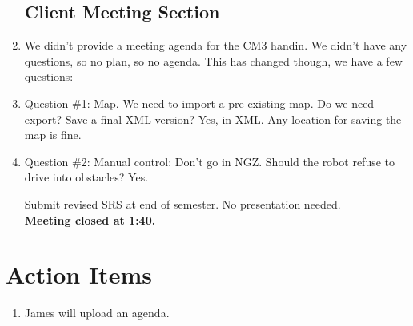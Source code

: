 \documentclass{article}
\begin{document}
\begin{enumerate}
\subsection{Client Meeting Section}

\item We didn't provide a meeting agenda for the CM3 handin. We didn’t have any questions, so no plan, so no agenda. This has changed though, we have a few questions:

\item Question \#1: Map. We need to import a pre-existing map. Do we need export? Save a final XML version? Yes, in XML. Any location for saving the map is fine.

\item Question \#2: Manual control: Don’t go in NGZ. Should the robot refuse to drive into obstacles? Yes.


Submit revised SRS at end of semester. No presentation needed.\\
\vspace{.5cm}
\textbf{Meeting closed at 1:40.}\\
\end{enumerate}

\section{Action Items}
\begin{enumerate}
\item James will upload an agenda.
\end{enumerate}
\end{document}
